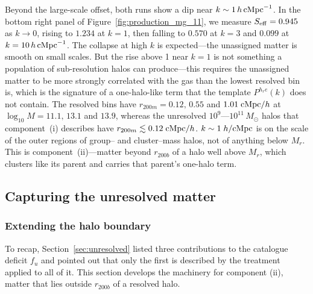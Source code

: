 \documentclass{article}
\begin{document}
Beyond the large-scale offset, both runs show a
dip near $k\sim1\,h\,{\rm cMpc}^{-1}$. In the bottom right panel of Figure~\ref{fig:production_mg_11}, we measure $S_{\rm eff} = 0.945$ as
$k\to0$, rising to $1.234$ at $k=1$, then falling to $0.570$ at $k=3$ and
$0.099$ at $k=10\,h\,{\rm cMpc}^{-1}$. The collapse at high $k$ is expected---the unassigned matter is smooth on small scales. But the rise above 1 near
$k=1$ is not something a population of sub-resolution halos can produce---this requires the unassigned matter to be
more strongly correlated with the gas than the lowest resolved bin is, which is
the signature of a one-halo-like term that the template $P^{h_re}(k)$ does not
contain. The resolved bins have
$r_{200m} = 0.12,\,0.55$ and $1.01\;{\rm cMpc}/h$ at
$\log_{10}M = 11.1,\,13.1$ and $13.9$, whereas the unresolved
$10^{9}$---$10^{11}\,M_\odot$ halos that component~(i) describes have
$r_{200m}\lesssim0.12\;{\rm cMpc}/h$. $k\sim1\;h/{\rm cMpc}$ is on the scale of the outer regions of
group-- and cluster--mass halos, not of anything below $M_r$. This is
component~(ii)---matter beyond $r_{200b}$ of a
halo well above $M_r$, which clusters like its parent and carries that
parent's one-halo term.

\subsection{Capturing the unresolved matter}

\subsubsection{Extending the halo boundary}

To recap, Section~\ref{sec:unresolved} listed three contributions to the catalogue deficit
$f_u$ and pointed out that only the first is described by the treatment applied to all of it. This section develops the machinery for component (ii), matter that lies outside
$r_{200b}$ of a resolved halo.
\end{document}
